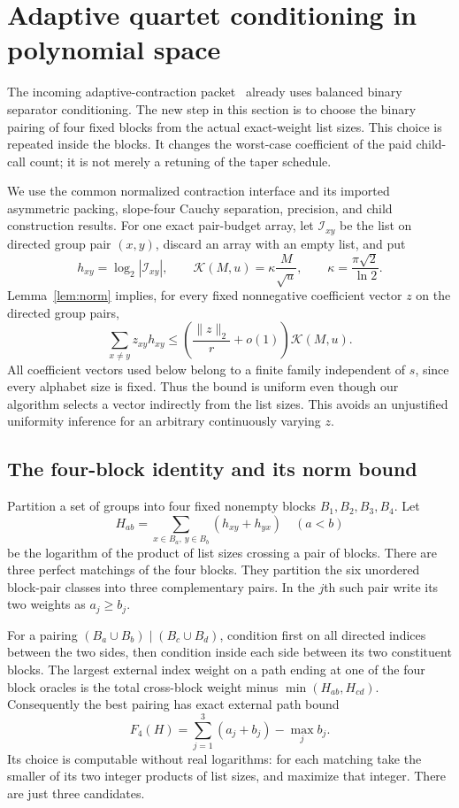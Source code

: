 \section{Adaptive quartet conditioning in polynomial space}
\label{sec:quartet}

The incoming adaptive-contraction packet~\cite{incomingadaptive} already uses balanced binary
separator conditioning. The new step in this section is to choose the
binary pairing of four fixed blocks from the actual exact-weight list
sizes. This choice is repeated inside the blocks. It changes the
worst-case coefficient of the paid child-call count; it is not merely a
retuning of the taper schedule.

We use the common normalized contraction interface and its imported
asymmetric packing, slope-four Cauchy separation, precision, and child
construction results. For one exact pair-budget array, let
$\mathcal I_{xy}$ be the list on directed group pair $(x,y)$, discard an
array with an empty list, and put
\[
 h_{xy}=\log_2|\mathcal I_{xy}|,\qquad
 \mathcal K(M,u)=\kappa\frac{M}{\sqrt u},\qquad
 \kappa=\frac{\pi\sqrt2}{\ln2}.
\]
Lemma~\ref{lem:norm} implies, for every fixed nonnegative
coefficient vector $z$ on the directed group pairs,
\begin{equation}\label{eq:quartet-entropy}
 \sum_{x\ne y}z_{xy}h_{xy}
 \le\left(\frac{\|z\|_2}{r}+o(1)\right)\mathcal K(M,u).
\end{equation}
All coefficient vectors used below belong to a finite family independent
of $s$, since every alphabet size is fixed. Thus the bound is uniform
even though our algorithm selects a vector indirectly from the list sizes.
This avoids an unjustified uniformity inference for an arbitrary
continuously varying $z$.

\subsection{The four-block identity and its norm bound}

Partition a set of groups into four fixed nonempty blocks
$B_1,B_2,B_3,B_4$. Let
\[
 H_{ab}=\sum_{x\in B_a,\,y\in B_b}(h_{xy}+h_{yx})
 \quad (a<b)
\]
be the logarithm of the product of list sizes crossing a pair of blocks.
There are three perfect matchings of the four blocks. They partition the
six unordered block-pair classes into three complementary pairs. In the
$j$th such pair write its two weights as $a_j\ge b_j$.

For a pairing $(B_a\cup B_b)\mid(B_c\cup B_d)$, condition first on
all directed indices between the two sides, then condition inside each
side between its two constituent blocks. The largest external index
weight on a path ending at one of the four block oracles is the total
cross-block weight minus $\min(H_{ab},H_{cd})$. Consequently the best
pairing has exact external path bound
\begin{equation}\label{eq:quartet-F}
 F_4(H)=\sum_{j=1}^3(a_j+b_j)-\max_j b_j.
\end{equation}
Its choice is computable without real logarithms: for each matching take
the smaller of its two integer products of list sizes, and maximize that
integer. There are just three candidates.

